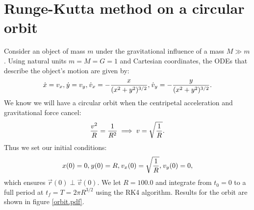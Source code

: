 \documentclass{article}
\begin{document}
\section{Runge-Kutta method on a circular orbit}

Consider an object of mass $m$ under the gravitational influence of a
mass $M \gg m$. Using natural units $m = M = G = 1$ and Cartesian coordinates,
the ODEs that describe the object's motion are given by:
\begin{align}
    \dot x = v_x,
    \sp{}
    \dot y = v_y,
    \sp{}
    \dot v_x = -{x \over (x^2 + y^2)^{3/2}},
    \sp{}
    \dot v_y = -{y \over (x^2 + y^2)^{3/2}}.
\end{align}
We know we will have a circular orbit when the centripetal acceleration
and gravitational force cancel:
\begin{align}
    {v^2 \over R} = {1 \over R^2} \implies v = \sqrt{1 \over R}.
\end{align}
Thus we set our initial conditions:
\begin{align}
    x(0) = 0,
    \sp{}
    y(0) = R,
    \sp{}
    v_x(0) = \sqrt{1 \over R},
    \sp{}
    v_y(0) = 0,
\end{align}
which ensures $\vec r(0) \perp \vec v(0)$. We let $R = 100.0$ and integrate
from $t_0 = 0$ to a full period at $t_f = T = 2\pi R^{3/2}$ using the RK4
algorithm. Results for the orbit are shown in figure \ref{orbit.pdf}.


\end{document}
